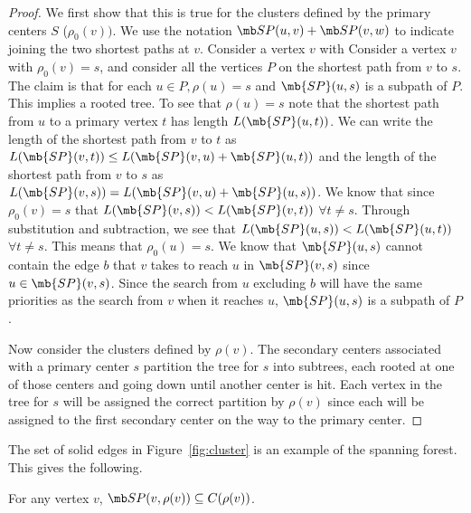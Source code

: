 \begin{proof}%
	We first show that this is true for the clusters defined by the
	primary centers $S$ ($\rho_0(v))$.
        We use the notation
        $\p(u,v)+\p(v,w)$ to indicate joining the two shortest paths
        at $v$. Consider a vertex $v$ with
        Consider a vertex $v$ with
	$\rho_0(v) = s$, and consider all the vertices $P$ on the shortest
	path from $v$ to $s$.  The claim is that for each $u \in P, \rho(u) =
	s$ and $\mb{SP}(u,s)$ is a subpath of $P$. This implies a
	rooted tree. To see that $\rho(u) = s$ note that the shortest path
	from $u$ to a primary vertex $t$ has length $L(\mb{SP}(u,t))$. We can write the
	length of the shortest path from $v$ to $t$ as
	$L(\mb{SP}(v,t)) \leq L(\mb{SP}(v,u) + \mb{SP}(u,t))$ and the length of the
	shortest path from $v$ to $s$ as
	$L(\mb{SP}(v,s)) = L(\mb{SP}(v,u) + \mb{SP}(u,s))$.
	We know that since $\rho_0(v) = s$
	that $L(\mb{SP}(v,s)) < L(\mb{SP}(v,t))$ $\forall t \neq s$. Through substitution and subtraction,
	we see that $L(\mb{SP}(u,s)) < L(\mb{SP}(u,t))$ $\forall t \neq s$. This means that $\rho_0(u) = s$.
	We know that $\mb{SP}(u,s)$ cannot contain the edge $b$ that $v$ takes to reach $u$
	in $\mb{SP}(v,s)$ since $u \in \mb{SP}(v,s)$. Since the search from $u$ excluding
	$b$ will have the same priorities as the search from $v$ when it
	reaches $u$, $\mb{SP}(u,s)$ is a subpath of $P$.
	
	Now consider the clusters defined by $\rho(v)$.  The secondary centers
	associated with a primary center $s$ partition the tree for $s$ into
	subtrees, each rooted at one of those centers and going down until
	another center is hit.  Each vertex in the tree for $s$ will be
	assigned the correct partition by $\rho(v)$ since each will be
	assigned to the first secondary center on the way to the primary
	center.
\end{proof}


The set of solid edges in Figure~\ref{fig:cluster} is an example of
the spanning forest.  This gives the following.

\begin{corollary}
	\label{cor:clustertree}
For any vertex $v$, $\p(v,\rho(v)) \subseteq C(\rho(v))$.
\end{corollary}


